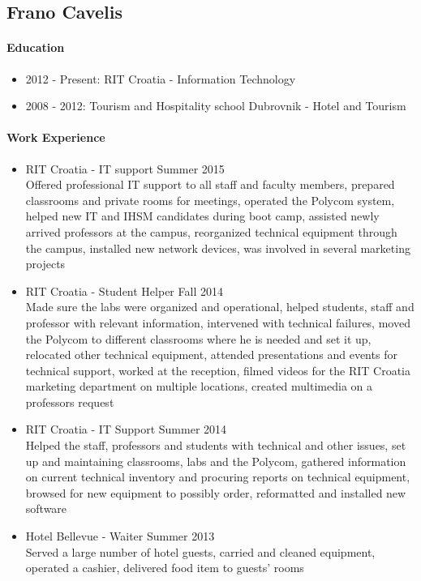 \subsection{Frano Cavelis}
	\paragraph{Education}
		\begin{itemize}
			\item 2012 - Present: RIT Croatia - Information Technology
			\item 2008 - 2012: Tourism and Hospitality school Dubrovnik - Hotel and Tourism
		\end{itemize}
	\paragraph{Work Experience}
		\begin{itemize}
			\item RIT Croatia - IT support \hfill Summer 2015\\
			Offered professional IT support to all staff and faculty members, prepared classrooms and private rooms for meetings, operated the Polycom system, helped new IT and IHSM candidates during boot camp, assisted newly arrived professors at the campus, reorganized technical equipment through the campus, installed new network devices, was involved in several marketing projects
			\item RIT Croatia - Student Helper \hfill Fall 2014\\
			Made sure the labs were organized and operational, helped students, staff and professor with relevant information, intervened with technical failures, moved the Polycom to different classrooms where he is needed and set it up, relocated other technical equipment, attended presentations and events for technical support, worked at the reception, filmed videos for the RIT Croatia marketing department on multiple locations, created multimedia on a professors request
			\item RIT Croatia - IT Support \hfill Summer 2014\\
			Helped the staff, professors and students with technical and other issues, set up and maintaining classrooms, labs and the Polycom, gathered information on current technical inventory and procuring reports on technical equipment, browsed for new equipment to possibly order, reformatted and installed new software
			\item Hotel Bellevue - Waiter \hfill Summer 2013\\
			Served a large number of hotel guests, carried and cleaned equipment, operated a cashier, delivered food item to guests' rooms
		\end{itemize}
